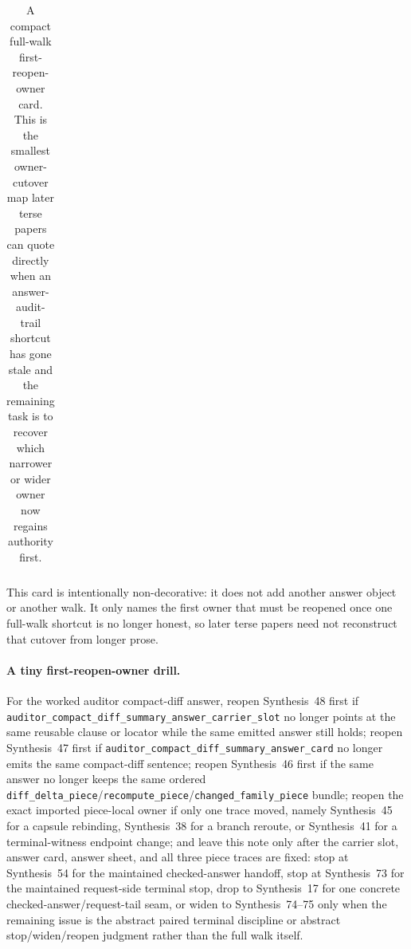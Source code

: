 \documentclass[11pt]{article}
\begin{document}
\begin{table}[t]
\begin{tabularx}{\linewidth}{@{}>{\raggedright\arraybackslash}X>{\raggedright\arraybackslash}X>{\raggedright\arraybackslash}X@{}}
\bottomrule
\end{tabularx}
\caption{A compact full-walk first-reopen-owner card. This is the smallest owner-cutover map later terse papers can quote directly when an answer-audit-trail shortcut has gone stale and the remaining task is to recover which narrower or wider owner now regains authority first.}
\label{tab:answer-audit-trail-first-reopen-owner-card}
\end{table}

This card is intentionally non-decorative: it does not add another answer object or another walk. It only names the first owner that must be reopened once one full-walk shortcut is no longer honest, so later terse papers need not reconstruct that cutover from longer prose.\cite{series:challengeanswercapsules,series:challengebranches,series:challengeterminalwitnesses,series:challengeanswersheets,series:challengeanswercards,series:challengeanswercarrierslots,series:challengeanswerreviewmenus,series:pairedterminalcitationdiscipline,series:pairedterminalcutoverrules}

\paragraph{A tiny first-reopen-owner drill.}
For the worked auditor compact-diff answer, reopen Synthesis~48 first if \nolinkurl{auditor_compact_diff_summary_answer_carrier_slot} no longer points at the same reusable clause or locator while the same emitted answer still holds; reopen Synthesis~47 first if \nolinkurl{auditor_compact_diff_summary_answer_card} no longer emits the same compact-diff sentence; reopen Synthesis~46 first if the same answer no longer keeps the same ordered \nolinkurl{diff_delta_piece}/\nolinkurl{recompute_piece}/\nolinkurl{changed_family_piece} bundle; reopen the exact imported piece-local owner if only one trace moved, namely Synthesis~45 for a capsule rebinding, Synthesis~38 for a branch reroute, or Synthesis~41 for a terminal-witness endpoint change; and leave this note only after the carrier slot, answer card, answer sheet, and all three piece traces are fixed: stop at Synthesis~54 for the maintained checked-answer handoff, stop at Synthesis~73 for the maintained request-side terminal stop, drop to Synthesis~17 for one concrete checked-answer/request-tail seam, or widen to Synthesis~74--75 only when the remaining issue is the abstract paired terminal discipline or abstract stop/widen/reopen judgment rather than the full walk itself.\cite{series:workedexample}
\end{document}
